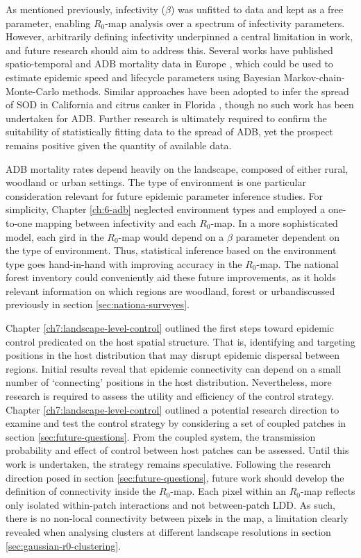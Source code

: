 As mentioned previously, infectivity ($\beta$) was unfitted to data and kept as a free parameter, enabling $R_0$-map analysis over a spectrum of infectivity parameters. 
However, arbitrarily defining infectivity underpinned a central limitation in work, and future research should aim to address this. 
Several works have published spatio-temporal and ADB mortality data in Europe \cite{https://doi.org/10.1111/1365-2745.13383, https://doi.org/10.1002/ppp3.11, stocks2017first, lohmus2014ash}, which could be used to estimate epidemic speed and lifecycle parameters using Bayesian Markov-chain-Monte-Carlo methods.
Similar approaches have been adopted to infer the spread of SOD in California \cite{10.1371/journal.pcbi.1002328} and citrus canker in Florida \cite{neri2014bayesian}, though no such work has been undertaken for ADB.
Further research is ultimately required to confirm the suitability of statistically fitting data to the spread of ADB, yet the prospect remains positive given the quantity of available data.

ADB mortality rates depend heavily on the landscape, composed of either rural, woodland or urban settings.
The type of environment is one particular consideration relevant for future epidemic parameter inference studies.
For simplicity, Chapter \ref{ch:6-adb} neglected environment types and employed a one-to-one mapping between infectivity and each $R_0$-map. In a more sophisticated model, each gird in the $R_0$-map would depend on a $\beta$ parameter dependent on the type of environment.
Thus, statistical inference based on the environment type goes hand-in-hand with improving accuracy in the $R_0$-map.
The national forest inventory could conveniently aid these future improvements, as it holds relevant information on which regions are woodland, forest or urban\textemdash discussed previously in section \ref{sec:nationa-surveyes}.

Chapter \ref{ch7:landscape-level-control} outlined the first steps toward epidemic control predicated on the host spatial structure.
That is, identifying and targeting positions in the host distribution that may disrupt epidemic dispersal between regions.
Initial results reveal that epidemic connectivity can depend on a small number of `connecting' positions in the host distribution.
Nevertheless, more research is required to assess the utility and efficiency of the control strategy. Chapter \ref{ch7:landscape-level-control}
outlined a potential research direction to examine and test the control strategy by considering a set of coupled patches in section \ref{sec:future-questions}.
From the coupled system, the transmission probability and effect of control between host patches can be assessed.
Until this work is undertaken, the strategy remains speculative.
Following the research direction posed in section \ref{sec:future-questions}, future work should develop the definition of connectivity inside the $R_0$-map. Each pixel within an $R_0$-map reflects only isolated within-patch interactions and not between-patch LDD.
As such, there is no non-local connectivity between pixels in the map, 
a limitation clearly revealed when analysing clusters at different landscape resolutions in section \ref{sec:gaussian-r0-clustering}.

